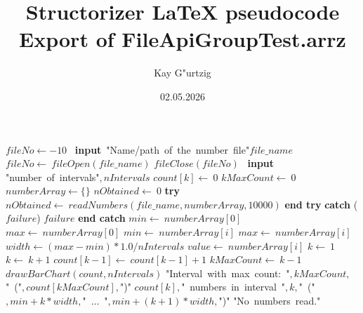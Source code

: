 \documentclass[a4paper,10pt]{article}
\title{Structorizer LaTeX pseudocode Export of FileApiGroupTest.arrz}
\author{Kay G"urtzig}
\date{02.05.2026}
\begin{document}
\begin{algorithm}
\caption{DrawRandomHistogram()}
\begin{algorithmic}[5]

\STATE {}
\STATE {}
  \STATE \(fileNo\gets-10\)
  \REPEAT
    \STATE\ \textbf{input}\ \(\)"{}Name/path\ of\ the\ number\ file"{}\(file\_name\)
    \STATE \(fileNo\gets\ fileOpen(file\_name)\)
    \STATE \(fileClose(fileNo)\)
    \STATE\ \textbf{input}\ \(\)"{}number\ of\ intervals"{}\(,nIntervals\)
      \STATE \(count[k]\gets\ 0\)
    \ENDFOR
    \STATE \(kMaxCount\gets\ 0\)
    \STATE \(numberArray\gets\{\}\)
    \STATE \(nObtained\gets\ 0\)
    \STATE \textbf{try}  \BODY
      \STATE \(nObtained\gets\ readNumbers(file\_name,numberArray,10000)\)
    \ENDBODY \STATE \textbf{end try}
    \STATE \textbf{catch} (\(failure\)) \BODY
      \PRINT\(failure\)
    \ENDBODY \STATE \textbf{end catch}
      \STATE \(min\gets\ numberArray[0]\)
      \STATE \(max\gets\ numberArray[0]\)
          \STATE \(min\gets\ numberArray[i]\)
        \ELSE
            \STATE \(max\gets\ numberArray[i]\)
          \ENDIF
        \ENDIF
      \ENDFOR
      \STATE \(width\gets(max-min)*1.0/nIntervals\)
        \STATE \(value\gets\ numberArray[i]\)
        \STATE \(k\gets\ 1\)
          \STATE \(k\gets\ k+1\)
        \ENDWHILE
        \STATE \(count[k-1]\gets\ count[k-1]+1\)
          \STATE \(kMaxCount\gets\ k-1\)
        \ENDIF
      \ENDFOR
      \STATE \(drawBarChart(count,nIntervals)\)
      \PRINT\(\)"{}Interval\ with\ max\ count:\ "{}\(,kMaxCount,\)"{}\ ("{}\(,count[kMaxCount],\)"{})"{}\(\)
        \PRINT\(count[k],\)"{}\ numbers\ in\ interval\ "{}\(,k,\)"{}\ ("{}\(,min+k*width,\)"{}\ ...\ "{}\(,min+(k+1)*width,\)"{})"{}\(\)
      \ENDFOR
    \ELSE
      \PRINT\(\)"{}No\ numbers\ read."{}\(\)
    \ENDIF
  \ENDIF

\end{algorithmic}
\end{algorithm}
\end{document}
